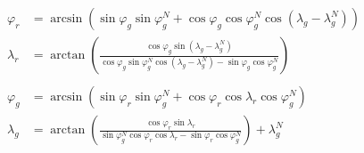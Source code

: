 \documentclass[12pt]{article}
\begin{document}
\begin{align*}
  \varphi_r &=\arcsin
  \left(
    \sin\varphi_g\sin\varphi_g^N+
    \cos\varphi_g\cos\varphi_g^N\cos\left(\lambda_g-\lambda_g^N\right)
  \right)\\
  \lambda_r &=\arctan
  \left(
    \frac
    {\cos\varphi_g\sin\left(\lambda_g-\lambda_g^N\right)}
    {\cos\varphi_g\sin\varphi_g^N\cos\left(\lambda_g-\lambda_g^N\right)
    -\sin\varphi_g\cos\varphi_g^N}
  \right)\\\\
  \varphi_g &=\arcsin
  \left(
    \sin\varphi_r\sin\varphi_g^N+
    \cos\varphi_r\cos\lambda_r\cos\varphi_g^N
  \right)\\
  \lambda_g &=\arctan
  \left(
    \frac
    {\cos\varphi_r\sin\lambda_r}
    {\sin\varphi_g^N\cos\varphi_r\cos\lambda_r
    -\sin\varphi_r\cos\varphi_g^N}
  \right)  +\lambda_g^N
\end{align*}
\end{document}
